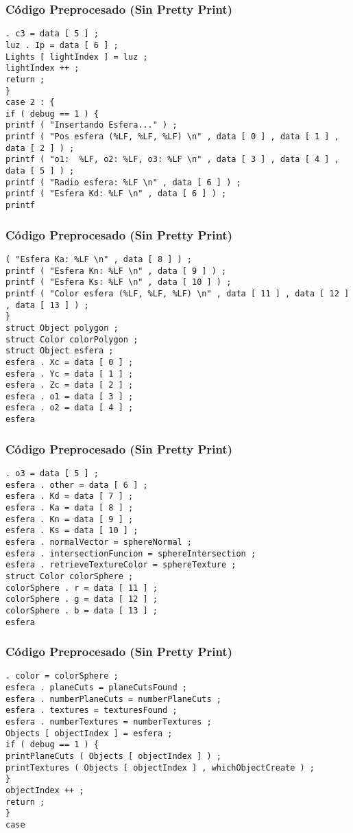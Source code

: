 \documentclass{beamer}
\begin{document}
\begin{frame}[fragile]
\frametitle{C\'odigo Preprocesado (Sin Pretty Print)}
\begin{lstlisting}[style=CStyle]
. c3 = data [ 5 ] ; 
luz . Ip = data [ 6 ] ; 
Lights [ lightIndex ] = luz ; 
lightIndex ++ ; 
return ; 
} 
case 2 : { 
if ( debug == 1 ) { 
printf ( "Insertando Esfera..." ) ; 
printf ( "Pos esfera (%LF, %LF, %LF) \n" , data [ 0 ] , data [ 1 ] , data [ 2 ] ) ; 
printf ( "o1:  %LF, o2: %LF, o3: %LF \n" , data [ 3 ] , data [ 4 ] , data [ 5 ] ) ; 
printf ( "Radio esfera: %LF \n" , data [ 6 ] ) ; 
printf ( "Esfera Kd: %LF \n" , data [ 6 ] ) ; 
printf \end{lstlisting}
\end{frame}
\begin{frame}[fragile]
\frametitle{C\'odigo Preprocesado (Sin Pretty Print)}
\begin{lstlisting}[style=CStyle]
( "Esfera Ka: %LF \n" , data [ 8 ] ) ; 
printf ( "Esfera Kn: %LF \n" , data [ 9 ] ) ; 
printf ( "Esfera Ks: %LF \n" , data [ 10 ] ) ; 
printf ( "Color esfera (%LF, %LF, %LF) \n" , data [ 11 ] , data [ 12 ] , data [ 13 ] ) ; 
} 
struct Object polygon ; 
struct Color colorPolygon ; 
struct Object esfera ; 
esfera . Xc = data [ 0 ] ; 
esfera . Yc = data [ 1 ] ; 
esfera . Zc = data [ 2 ] ; 
esfera . o1 = data [ 3 ] ; 
esfera . o2 = data [ 4 ] ; 
esfera \end{lstlisting}
\end{frame}
\begin{frame}[fragile]
\frametitle{C\'odigo Preprocesado (Sin Pretty Print)}
\begin{lstlisting}[style=CStyle]
. o3 = data [ 5 ] ; 
esfera . other = data [ 6 ] ; 
esfera . Kd = data [ 7 ] ; 
esfera . Ka = data [ 8 ] ; 
esfera . Kn = data [ 9 ] ; 
esfera . Ks = data [ 10 ] ; 
esfera . normalVector = sphereNormal ; 
esfera . intersectionFuncion = sphereIntersection ; 
esfera . retrieveTextureColor = sphereTexture ; 
struct Color colorSphere ; 
colorSphere . r = data [ 11 ] ; 
colorSphere . g = data [ 12 ] ; 
colorSphere . b = data [ 13 ] ; 
esfera \end{lstlisting}
\end{frame}
\begin{frame}[fragile]
\frametitle{C\'odigo Preprocesado (Sin Pretty Print)}
\begin{lstlisting}[style=CStyle]
. color = colorSphere ; 
esfera . planeCuts = planeCutsFound ; 
esfera . numberPlaneCuts = numberPlaneCuts ; 
esfera . textures = texturesFound ; 
esfera . numberTextures = numberTextures ; 
Objects [ objectIndex ] = esfera ; 
if ( debug == 1 ) { 
printPlaneCuts ( Objects [ objectIndex ] ) ; 
printTextures ( Objects [ objectIndex ] , whichObjectCreate ) ; 
} 
objectIndex ++ ; 
return ; 
} 
case \end{lstlisting}
\end{frame}
\end{document}
